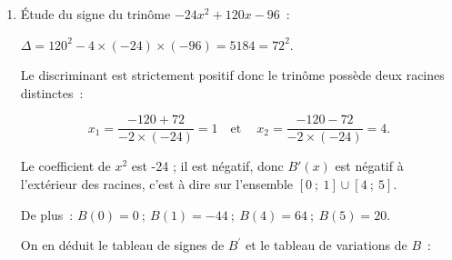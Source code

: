 \begin{corrige}
\begin{enumerate}
          \item \'Etude du signe du trinôme $-24x^2+120x-96$~:
          \par
          $\Delta=120^2-4 \times (-24)\times (-96)=5184=72^2$.
          \par
          Le discriminant est strictement positif donc le trinôme possède deux racines distinctes~:
          \par
          \[ x_1=\dfrac{-120+72}{-2\times (-24)}=1 \quad \text{et} \quad\ x_2=\dfrac{-120-72}{-2\times (-24)}=4. \]
          \par
          Le coefficient de $x^2$ est -24 ; il est négatif, donc $B'(x)$ est négatif à l'extérieur des racines, c'est à dire sur l'ensemble $[0~;~1] \cup [4~;~5]$.
          \par
          De plus~: $B(0)=0 \ ;\ B(1)=-44\ ;\ B(4)=64\ ;\ B(5)=20$.
          \par
          \par
          On en déduit le tableau de signes de $B^{\prime}$ et le tableau de variations de $B$~:
          \begin{center}
               \begin{extern}%
\end{extern}
\end{center}
\end{enumerate}
\end{corrige}
